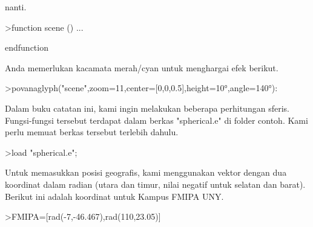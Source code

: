 \documentclass[a4paper,10pt]{article}
\begin{document}
\begin{eulernotebook}
\begin{eulercomment}
\begin{eulercomment}
\begin{eulercomment}
\begin{eulercomment}
\begin{eulercomment}
\begin{eulercomment}
\begin{eulercomment}
\begin{eulercomment}
\begin{eulercomment}
\begin{eulercomment}
\begin{eulercomment}
\begin{eulercomment}
\begin{eulercomment}
\begin{eulercomment}
\begin{eulercomment}
\begin{eulercomment}
\begin{eulercomment}
\begin{eulercomment}
\begin{eulercomment}
\begin{eulercomment}
\begin{eulercomment}
\begin{eulercomment}
\begin{eulercomment}
\begin{eulercomment}
\begin{eulercomment}
\begin{eulercomment}
\begin{eulercomment}
\begin{eulercomment}
\begin{eulercomment}
\begin{eulercomment}
\begin{eulercomment}
\begin{eulercomment}
\begin{eulercomment}
\begin{eulercomment}
\begin{eulercomment}
\begin{eulercomment}
\begin{eulercomment}
\begin{eulercomment}
\begin{eulercomment}
\begin{eulercomment}
\begin{eulercomment}
\begin{eulercomment}
\begin{eulercomment}
\begin{eulercomment}
\begin{eulercomment}
\begin{eulercomment}
\begin{eulercomment}
\begin{eulercomment}
\begin{eulercomment}
\begin{eulercomment}
\begin{eulercomment}
\begin{eulercomment}
\begin{eulercomment}
\begin{eulercomment}
\begin{eulercomment}
\begin{eulercomment}
\begin{eulercomment}
\begin{eulercomment}
\begin{eulercomment}
\begin{eulercomment}
\begin{eulercomment}
\begin{eulercomment}
\begin{eulercomment}
\begin{eulercomment}
\begin{eulercomment}
nanti.
\end{eulercomment}
\begin{eulerprompt}
>function scene () ...
\end{eulerprompt}
\begin{eulerudf}
  endfunction
\end{eulerudf}
\begin{eulercomment}
Anda memerlukan kacamata merah/cyan untuk menghargai efek berikut.
\end{eulercomment}
\begin{eulerprompt}
>povanaglyph("scene",zoom=11,center=[0,0,0.5],height=10°,angle=140°):
\end{eulerprompt}
\begin{eulercomment}
Dalam buku catatan ini, kami ingin melakukan beberapa perhitungan
sferis. Fungsi-fungsi tersebut terdapat dalam berkas "spherical.e" di
folder contoh. Kami perlu memuat berkas tersebut terlebih dahulu.
\end{eulercomment}
\begin{eulerprompt}
>load "spherical.e";
\end{eulerprompt}
\begin{eulercomment}
Untuk memasukkan posisi geografis, kami menggunakan vektor dengan dua
koordinat dalam radian (utara dan timur, nilai negatif untuk selatan
dan barat). Berikut ini adalah koordinat untuk Kampus FMIPA UNY.
\end{eulercomment}
\begin{eulerprompt}
>FMIPA=[rad(-7,-46.467),rad(110,23.05)]
\end{eulerprompt}
\begin{euleroutput}
  
\end{euleroutput}
\end{eulercomment}
\end{eulercomment}
\end{eulercomment}
\end{eulercomment}
\end{eulercomment}
\end{eulercomment}
\end{eulercomment}
\end{eulercomment}
\end{eulercomment}
\end{eulercomment}
\end{eulercomment}
\end{eulercomment}
\end{eulercomment}
\end{eulercomment}
\end{eulercomment}
\end{eulercomment}
\end{eulercomment}
\end{eulercomment}
\end{eulercomment}
\end{eulercomment}
\end{eulercomment}
\end{eulercomment}
\end{eulercomment}
\end{eulercomment}
\end{eulercomment}
\end{eulercomment}
\end{eulercomment}
\end{eulercomment}
\end{eulercomment}
\end{eulercomment}
\end{eulercomment}
\end{eulercomment}
\end{eulercomment}
\end{eulercomment}
\end{eulercomment}
\end{eulercomment}
\end{eulercomment}
\end{eulercomment}
\end{eulercomment}
\end{eulercomment}
\end{eulercomment}
\end{eulercomment}
\end{eulercomment}
\end{eulercomment}
\end{eulercomment}
\end{eulercomment}
\end{eulercomment}
\end{eulercomment}
\end{eulercomment}
\end{eulercomment}
\end{eulercomment}
\end{eulercomment}
\end{eulercomment}
\end{eulercomment}
\end{eulercomment}
\end{eulercomment}
\end{eulercomment}
\end{eulercomment}
\end{eulercomment}
\end{eulercomment}
\end{eulercomment}
\end{eulercomment}
\end{eulercomment}
\end{eulercomment}
\end{eulernotebook}
\end{document}
